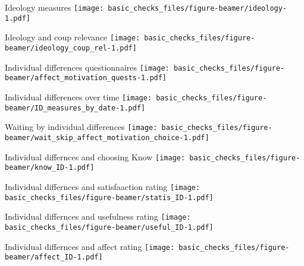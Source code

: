 \documentclass[
  ignorenonframetext,
]{beamer}
\begin{document}
\begin{frame}{Ideology measures}
\protect\hypertarget{ideology-measures}{}
\texttt{[image: basic\_checks\_files/figure-beamer/ideology-1.pdf]}
\end{frame}

\begin{frame}{Ideology and coup relevance}
\protect\hypertarget{ideology-and-coup-relevance}{}
\texttt{[image: basic\_checks\_files/figure-beamer/ideology\_coup\_rel-1.pdf]}
\end{frame}

\begin{frame}{Individual differences questionnaires}
\protect\hypertarget{individual-differences-questionnaires}{}
\texttt{[image: basic\_checks\_files/figure-beamer/affect\_motivation\_quests-1.pdf]}
\end{frame}

\begin{frame}{Individual differences over time}
\protect\hypertarget{individual-differences-over-time}{}
\texttt{[image: basic\_checks\_files/figure-beamer/ID\_measures\_by\_date-1.pdf]}
\end{frame}

\begin{frame}{Waiting by individual differences}
\protect\hypertarget{waiting-by-individual-differences}{}
\texttt{[image: basic\_checks\_files/figure-beamer/wait\_skip\_affect\_motivation\_choice-1.pdf]}
\end{frame}

\begin{frame}{Individual differnces and choosing Know}
\protect\hypertarget{individual-differnces-and-choosing-know}{}
\texttt{[image: basic\_checks\_files/figure-beamer/know\_ID-1.pdf]}
\end{frame}

\begin{frame}{Individual differnces and satisfaaction rating}
\protect\hypertarget{individual-differnces-and-satisfaaction-rating}{}
\texttt{[image: basic\_checks\_files/figure-beamer/statis\_ID-1.pdf]}
\end{frame}

\begin{frame}{Individual differnces and usefulness rating}
\protect\hypertarget{individual-differnces-and-usefulness-rating}{}
\texttt{[image: basic\_checks\_files/figure-beamer/useful\_ID-1.pdf]}
\end{frame}

\begin{frame}{Individual differnces and affect rating}
\protect\hypertarget{individual-differnces-and-affect-rating}{}
\texttt{[image: basic\_checks\_files/figure-beamer/affect\_ID-1.pdf]}
\end{frame}
\end{document}
